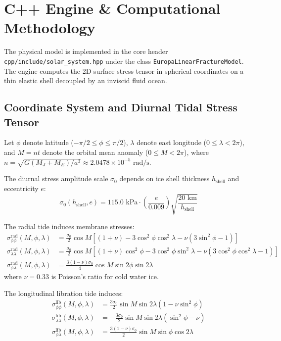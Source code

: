 \documentclass[11pt,a4paper]{article}
\begin{document}
\section{C++ Engine \& Computational Methodology}
The physical model is implemented in the core header \texttt{cpp/include/solar\_system.hpp} under the class \texttt{EuropaLinearFractureModel}. The engine computes the 2D surface stress tensor in spherical coordinates on a thin elastic shell decoupled by an inviscid fluid ocean.

\subsection{Coordinate System and Diurnal Tidal Stress Tensor}
Let $\phi$ denote latitude ($-\pi/2 \le \phi \le \pi/2$), $\lambda$ denote east longitude ($0 \le \lambda < 2\pi$), and $M = n t$ denote the orbital mean anomaly ($0 \le M < 2\pi$), where $n = \sqrt{G(M_J + M_E)/a^3} \approx 2.0478 \times 10^{-5}\text{ rad/s}$.

The diurnal stress amplitude scale $\sigma_0$ depends on ice shell thickness $h_{\text{shell}}$ and eccentricity $e$:
\begin{equation}
\sigma_0(h_{\text{shell}}, e) = 115.0\text{ kPa} \cdot \left(\frac{e}{0.009}\right) \sqrt{\frac{20\text{ km}}{h_{\text{shell}}}}
\end{equation}

The radial tide induces membrane stresses:
\begin{align}
\sigma_{\phi\phi}^{\text{rad}}(M, \phi, \lambda) &= \frac{\sigma_0}{2} \cos M \left[ (1 + \nu) - 3\cos^2\phi\cos^2\lambda - \nu(3\sin^2\phi - 1) \right] \\
\sigma_{\lambda\lambda}^{\text{rad}}(M, \phi, \lambda) &= \frac{\sigma_0}{2} \cos M \left[ (1 + \nu)\cos^2\phi - 3\cos^2\phi\sin^2\lambda - \nu(3\cos^2\phi\cos^2\lambda - 1) \right] \\
\sigma_{\phi\lambda}^{\text{rad}}(M, \phi, \lambda) &= \frac{3(1 - \nu)\sigma_0}{4} \cos M \sin 2\phi \sin 2\lambda
\end{align}
where $\nu = 0.33$ is Poisson's ratio for cold water ice.

The longitudinal libration tide induces:
\begin{align}
\sigma_{\phi\phi}^{\text{lib}}(M, \phi, \lambda) &= \frac{3\sigma_0}{2} \sin M \sin 2\lambda (1 - \nu \sin^2\phi) \\
\sigma_{\lambda\lambda}^{\text{lib}}(M, \phi, \lambda) &= -\frac{3\sigma_0}{2} \sin M \sin 2\lambda (\sin^2\phi - \nu) \\
\sigma_{\phi\lambda}^{\text{lib}}(M, \phi, \lambda) &= \frac{3(1 - \nu)\sigma_0}{2} \sin M \sin\phi \cos 2\lambda
\end{align}
\end{document}
